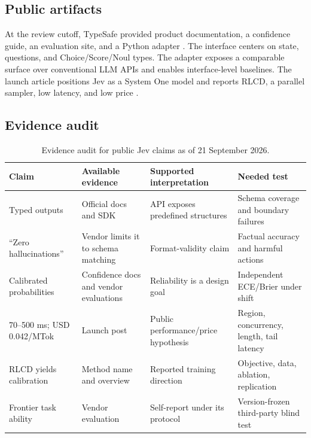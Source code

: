 \documentclass[11pt]{article}
\begin{document}
\subsection{Public artifacts}

At the review cutoff, TypeSafe provided product documentation, a confidence guide, an evaluation site, and a Python adapter \cite{typesafe2026docs,typesafe2026confidence,typesafe2026evals,typesafe2026adapter}. The interface centers on state, questions, and Choice/Score/Noul types. The adapter exposes a comparable surface over conventional LLM APIs and enables interface-level baselines. The launch article positions Jev as a System One model and reports RLCD, a parallel sampler, low latency, and low price \cite{almeida2026jev}.

\subsection{Evidence audit}

\begin{table}[t]
\centering\small
\begin{tabular}{p{.18\linewidth}p{.24\linewidth}p{.25\linewidth}p{.24\linewidth}}
\toprule
Claim & Available evidence & Supported interpretation & Needed test \\
\midrule
Typed outputs & Official docs and SDK & API exposes predefined structures & Schema coverage and boundary failures \\
``Zero hallucinations'' & Vendor limits it to schema matching & Format-validity claim & Factual accuracy and harmful actions \\
Calibrated probabilities & Confidence docs and vendor evaluations & Reliability is a design goal & Independent ECE/Brier under shift \\
70--500 ms; USD 0.042/MTok & Launch post & Public performance/price hypothesis & Region, concurrency, length, tail latency \\
RLCD yields calibration & Method name and overview & Reported training direction & Objective, data, ablation, replication \\
Frontier task ability & Vendor evaluation & Self-report under its protocol & Version-frozen third-party blind test \\
\bottomrule
\end{tabular}
\caption{Evidence audit for public Jev claims as of 21 September 2026.}
\label{tab:jev-audit}
\end{table}
\end{document}
